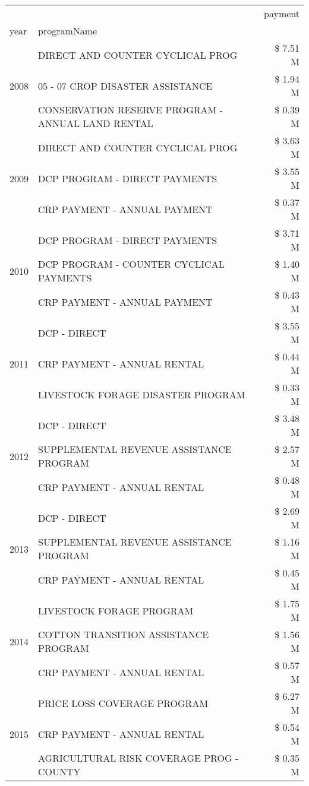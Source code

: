 \begin{tabular}{llr}
\toprule
 &  & payment \\
year & programName &  \\
\midrule
\multirow[t]{3}{*}{2008} & DIRECT AND COUNTER CYCLICAL PROG & \$ 7.51 M \\
 & 05 - 07 CROP DISASTER ASSISTANCE & \$ 1.94 M \\
 & CONSERVATION RESERVE PROGRAM - ANNUAL LAND RENTAL & \$ 0.39 M \\
\cline{1-3}
\multirow[t]{3}{*}{2009} & DIRECT AND COUNTER CYCLICAL PROG & \$ 3.63 M \\
 & DCP PROGRAM - DIRECT PAYMENTS & \$ 3.55 M \\
 & CRP PAYMENT - ANNUAL PAYMENT & \$ 0.37 M \\
\cline{1-3}
\multirow[t]{3}{*}{2010} & DCP PROGRAM - DIRECT PAYMENTS & \$ 3.71 M \\
 & DCP PROGRAM - COUNTER CYCLICAL PAYMENTS & \$ 1.40 M \\
 & CRP PAYMENT - ANNUAL PAYMENT & \$ 0.43 M \\
\cline{1-3}
\multirow[t]{3}{*}{2011} & DCP - DIRECT & \$ 3.55 M \\
 & CRP PAYMENT - ANNUAL RENTAL & \$ 0.44 M \\
 & LIVESTOCK FORAGE DISASTER PROGRAM & \$ 0.33 M \\
\cline{1-3}
\multirow[t]{3}{*}{2012} & DCP - DIRECT & \$ 3.48 M \\
 & SUPPLEMENTAL REVENUE ASSISTANCE PROGRAM & \$ 2.57 M \\
 & CRP PAYMENT - ANNUAL RENTAL & \$ 0.48 M \\
\cline{1-3}
\multirow[t]{3}{*}{2013} & DCP - DIRECT & \$ 2.69 M \\
 & SUPPLEMENTAL REVENUE ASSISTANCE PROGRAM & \$ 1.16 M \\
 & CRP PAYMENT - ANNUAL RENTAL & \$ 0.45 M \\
\cline{1-3}
\multirow[t]{3}{*}{2014} & LIVESTOCK FORAGE PROGRAM & \$ 1.75 M \\
 & COTTON TRANSITION ASSISTANCE PROGRAM & \$ 1.56 M \\
 & CRP PAYMENT - ANNUAL RENTAL & \$ 0.57 M \\
\cline{1-3}
\multirow[t]{3}{*}{2015} & PRICE LOSS COVERAGE PROGRAM & \$ 6.27 M \\
 & CRP PAYMENT - ANNUAL RENTAL & \$ 0.54 M \\
 & AGRICULTURAL RISK COVERAGE PROG - COUNTY & \$ 0.35 M \\

\end{tabular}
